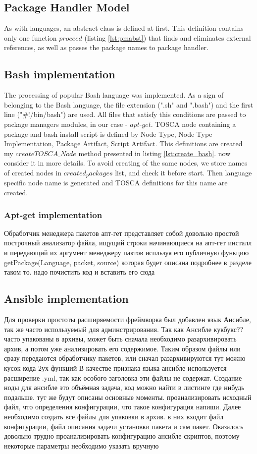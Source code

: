 \subsection*{Package Handler Model}
As with languages, an abstract class is defined at first.
This definition contains only one function $proceed$ (listing \ref{lst:pmabst}) that finds and eliminates external references, as well as passes the package names to package handler.

\subsection*{Bash implementation}
The processing of popular Bash language was implemented.
As a sign of belonging to the Bash language, the file extension (".sh" and ".bash") and the first line ("#!/bin/bash") are used. 
All files that satisfy this conditions are passed to package managers modules, in our case - $apt$-$get$. 
TOSCA node containing a package and bash install script is defined by Node Type, Node Type Implementation, Package Artifact, Script Artifact.
This definitions are created my $createTOSCA\_Node$ method presented in listing \ref{lst:create_bash}.
now consider it in more details.
To avoid creating of the same nodes, we store names of created nodes in $created_packages$ list, and check it before start.
Then language specific node name is generated and TOSCA definitions for this name are created.

\subsubsection*{Apt-get implementation}
Обработчик менеджера пакетов апт-гет представляет собой довольно простой построчный анализатор файла, ищущий строки начинающиеся на апт-гет инсталл и передающий их аргумент менеджеру пактов испльзуя его публичную функцию getPackage(Language, packet, source)
которая будет описана подробнее в разделе таком то. 
надо почистить код и вставить его сюда
\fi
\subsection*{Ansible implementation}
Для проверки простоты расширяемости фреймворка был добавлен язык Ансибле, так же часто используемый для админстрирования.
Так как Ансибле кукбукс?? часто упакованы в архивы, может быть сначала необходимо разархивировать архив, а потом уже анализировать  его содержимое. Таким образом файлы или сразу передаются обработчику пакетов, или сначал разархивируются 
тут можно кусок кода 2ух функций
В качестве признака языка ансибле используется расширение .yml, так как особого заголовка эти файлы не содержат.
Создание ноды для ансибле это объёмная задача, код можно найти в листинге где нибудь подальше. тут же будут описаны основные моменты.
проанализировать исходный файл, что определения конфигурации, что такое конфигурация напиши.
Далее необходимо создать все файлы для упаковки в архив. в них входит файл конфигурации, файл описания задачи установки пакета и сам пакет.
Оказалось довольно трудно проанализировать конфигурацию ансибле скриптов, поэтому некоторые параметры необходимо указать вручную
\fi
